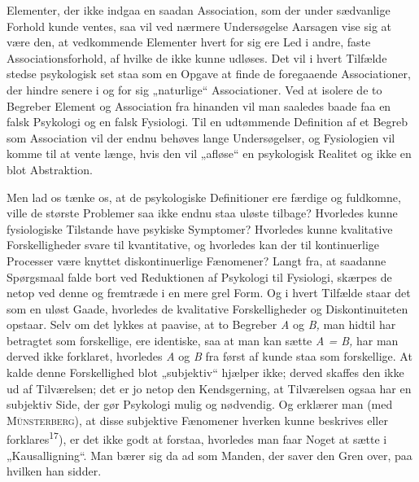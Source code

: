 \documentclass[12pt,a4paper,openany]{book}
\newcommand{\opage}[1]{\marginnote{\footnotesize\textit{[#1]}}}
\begin{document}
Elementer, der ikke indgaa en saadan Association, som der under sædvanlige
Forhold kunde ventes, saa vil ved nærmere Undersøgelse Aarsagen vise sig at
være den, at vedkommende Elementer hvert for sig ere Led i andre, faste
Associationsforhold, af hvilke de ikke kunne udløses. Det vil i hvert Tilfælde
stedse psykologisk set staa som en Opgave at finde de foregaaende
Associationer, der hindre senere i og for sig „naturlige“ Associationer. Ved at
isolere de to Begreber Element og Association fra hinanden vil man saaledes
baade faa en falsk Psykologi og en falsk Fysiologi. Til en udtømmende
Definition af et Begreb som Association vil der endnu behøves lange
Undersøgelser, og Fysiologien vil komme til at vente længe, hvis den vil
„afløse“ en psykologisk Realitet og ikke en blot Abstraktion.

Men lad os tænke os, at de psykologiske Definitioner ere færdige og fuldkomne,
ville de største Problemer saa ikke endnu staa uløste tilbage? Hvorledes kunne
fysiologiske Tilstande have psykiske Symptomer? Hvorledes kunne kvalitative
Forskelligheder svare til kvantitative, og hvorledes kan der til kontinuerlige
Processer være knyttet diskontinuerlige Fænomener? Langt fra, at saadanne
Spørgsmaal falde bort ved Reduktionen af Psykologi til Fysiologi, skærpes de
netop ved denne og fremtræde i en mere grel Form. Og i hvert Tilfælde staar det
som en uløst Gaade, hvorledes de kvalitative Forskelligheder og
Diskontinuiteten opstaar. Selv om det lykkes at paavise, at to Begreber
\textit{A} og \textit{B,} man hidtil har betragtet som forskellige, ere
identiske, saa at man kan sætte \textit{A = B,} har man derved ikke forklaret,
hvorledes \textit{A} og \textit{B} fra først af kunde staa som forskellige. At
kalde denne Forskellighed blot „subjektiv“ hjælper
\opage{18}ikke; derved skaffes den ikke ud af Tilværelsen; det er jo netop den
Kendsgerning, at Tilværelsen ogsaa har en subjektiv Side, der gør Psykologi
mulig og nødvendig. Og erklærer man (med \textsc{Münsterberg}), at disse
subjektive Fænomener hverken kunne beskrives eller
forklares\textsuperscript{17}), er det ikke godt at forstaa, hvorledes man faar
Noget at sætte i „Kausalligning“. Man bærer sig da ad som Manden, der saver den
Gren over, paa hvilken han sidder.
\end{document}
